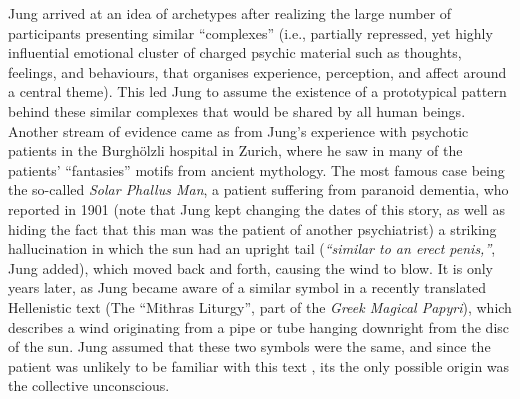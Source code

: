 \documentclass[
]{book}
\begin{document}
Jung arrived at an idea of archetypes after realizing the large number of participants presenting similar ``complexes'' (i.e., partially repressed, yet highly influential emotional cluster of charged psychic material such as thoughts, feelings, and behaviours, that organises experience, perception, and affect around a central theme). This led Jung to assume the existence of a prototypical pattern behind these similar complexes that would be shared by all human beings. Another stream of evidence came as from Jung's experience with psychotic patients in the Burghölzli hospital in Zurich, where he saw in many of the patients' ``fantasies'' motifs from ancient mythology. The most famous case being the so-called \emph{Solar Phallus Man}, a patient suffering from paranoid dementia, who reported in 1901 (note that Jung kept changing the dates of this story, as well as hiding the fact that this man was the patient of another psychiatrist) a striking hallucination in which the sun had an upright tail (\emph{``similar to an erect penis,''}, Jung added), which moved back and forth, causing the wind to blow. It is only years later, as Jung became aware of a similar symbol in a recently translated Hellenistic text (The ``Mithras Liturgy'', part of the \emph{Greek Magical Papyri}), which describes a wind originating from a pipe or tube hanging downright from the disc of the sun. Jung assumed that these two symbols were the same, and since the patient was unlikely to be familiar with this text \citep[or so claimed Jung; see][ for a detailed description of Jung's falsifications and lies]{noll1997jung}, its the only possible origin was the collective unconscious.
\end{document}
